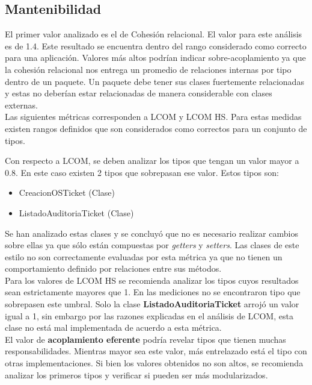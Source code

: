 \subsection{Mantenibilidad}

El primer valor analizado es el de Cohesión relacional. El valor para este análisis es de 1.4. Este resultado se
encuentra dentro del rango considerado como correcto para una aplicación. Valores
más altos podrían indicar sobre-acoplamiento ya que la cohesión relacional nos entrega un promedio de relaciones internas por tipo dentro de un
paquete. Un paquete debe tener sus clases fuertemente relacionadas y estas no deberían estar relacionadas de manera
considerable con clases externas.
\\

Las siguientes métricas corresponden a LCOM y LCOM HS. Para estas medidas existen rangos definidos que son considerados como correctos para un conjunto de tipos.

Con respecto a LCOM, se deben analizar los tipos que tengan un valor mayor a 0.8. En este caso existen 2 tipos que sobrepasan ese valor. Estos tipos son:
\begin{itemize}
\item CreacionOSTicket (Clase)
\item ListadoAuditoriaTicket (Clase)	
\end{itemize}

Se han analizado estas clases y se concluyó que no es necesario realizar 
cambios sobre ellas ya que sólo están compuestas por \textit{getters} 
y \textit{setters}. Las clases de este estilo no son correctamente evaluadas 
por esta métrica ya que no tienen un comportamiento definido por relaciones 
entre sus métodos.
\\

Para los valores de LCOM HS se recomienda analizar los tipos cuyos resultados 
sean estrictamente mayores que 1. En las mediciones no se encontraron tipo 
que sobrepasen este umbral. Solo la clase \textbf{ListadoAuditoriaTicket} 
arrojó un valor igual a 1, sin embargo por las razones explicadas en el análisis 
de LCOM, esta clase no está mal implementada de acuerdo a esta métrica.
\\

El valor de \textbf{acoplamiento eferente} podría revelar tipos que tienen 
muchas responsabilidades. Mientras mayor sea este valor, más entrelazado está 
el tipo con otras implementaciones. Si bien los valores obtenidos no son altos, 
se recomienda analizar los primeros tipos y verificar si pueden ser más modularizados.
\\

